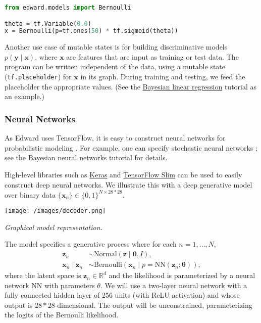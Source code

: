 \begin{lstlisting}[language=python]
from edward.models import Bernoulli

theta = tf.Variable(0.0)
x = Bernoulli(p=tf.ones(50) * tf.sigmoid(theta))
\end{lstlisting}

Another use case of mutable states is for building discriminative
models $p(\mathbf{y}\mid\mathbf{x})$, where $\mathbf{x}$ are features
that are input as training or test data. The program can be written
independent of the data, using a mutable state
(\texttt{tf.placeholder}) for $\mathbf{x}$ in its graph. During
training and testing, we feed the placeholder the appropriate values.
(See the
\href{/tutorials/bayesian-linear-regression}{Bayesian linear
regression} tutorial as an example.)

\subsubsection{Neural Networks}

As Edward uses TensorFlow, it is easy to construct neural networks for
probabilistic modeling \citep{rumelhart1988parallel}.
For example, one can specify stochastic neural networks
\citep{neal1990learning}; see the
\href{/tutorials/bayesian-neural-network}{Bayesian neural networks}
tutorial for details.

High-level libraries such as
\href{http://keras.io}{Keras} and
\href{https://github.com/tensorflow/tensorflow/tree/master/tensorflow/contrib/slim}{TensorFlow Slim}
can be used to easily construct deep neural networks.
We illustrate this with a deep generative model over binary data
$\{\mathbf{x}_n\}\in\{0,1\}^{N\times 28*28}$.

\texttt{[image: /images/decoder.png]}

{\small\textit{Graphical model representation.}}

The model specifies a generative process where for each
$n=1,\ldots,N$,
%
\begin{align*}
\mathbf{z}_n &\sim \text{Normal}(\mathbf{z} \mid \mathbf{0}, I), \\[1.5ex]
\mathbf{x}_n\mid \mathbf{z}_n &\sim \text{Bernoulli}(\mathbf{x}_n\mid
p=\mathrm{NN}(\mathbf{z}_n; \mathbf{\theta})),
\end{align*}
%
where the latent space is $\mathbf{z}_n\in\mathbb{R}^d$ and the
likelihood is parameterized by a neural network $\mathrm{NN}$ with
parameters $\theta$. We will use a two-layer neural network with a
fully connected hidden layer of 256 units (with ReLU activation) and
whose output is $28*28$-dimensional. The output will be unconstrained,
parameterizing the logits of the Bernoulli likelihood.

